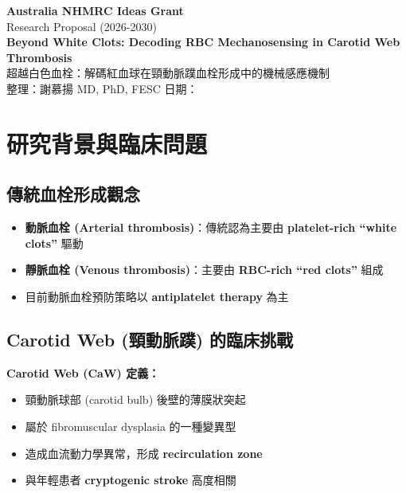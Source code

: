 \documentclass[12pt,a4paper]{article}
\begin{document}
\begin{center}
{\LARGE\bfseries\textcolor{emergency_red}{Australia NHMRC Ideas Grant}}\\[0.3cm]
{\Large\textcolor{emergency_blue}{Research Proposal (2026-2030)}}\\[0.5cm]
{\Large\textbf{Beyond White Clots: Decoding RBC Mechanosensing in Carotid Web Thrombosis}}\\[0.3cm]
{\large 超越白色血栓：解碼紅血球在頸動脈蹼血栓形成中的機械感應機制}\\[0.5cm]
{\normalsize 整理：謝慕揚 MD, PhD, FESC \quad 日期：\mydate}
\end{center}

\vspace{0.5cm}

\section{研究背景與臨床問題}

\subsection{傳統血栓形成觀念}

\begin{itemize}[leftmargin=2em]
    \item \textbf{動脈血栓 (Arterial thrombosis)}：傳統認為主要由 \textbf{platelet-rich ``white clots''} 驅動
    \item \textbf{靜脈血栓 (Venous thrombosis)}：主要由 \textbf{RBC-rich ``red clots''} 組成
    \item 目前動脈血栓預防策略以 \textbf{antiplatelet therapy} 為主
\end{itemize}

\subsection{Carotid Web (頸動脈蹼) 的臨床挑戰}

\begin{importantbox}
\textbf{Carotid Web (CaW) 定義：}
\begin{itemize}[leftmargin=2em]
    \item 頸動脈球部 (carotid bulb) 後壁的薄膜狀突起
    \item 屬於 fibromuscular dysplasia 的一種變異型
    \item 造成血流動力學異常，形成 \textbf{recirculation zone}
    \item 與年輕患者 \textbf{cryptogenic stroke} 高度相關
\end{itemize}
\end{importantbox}
\end{document}
